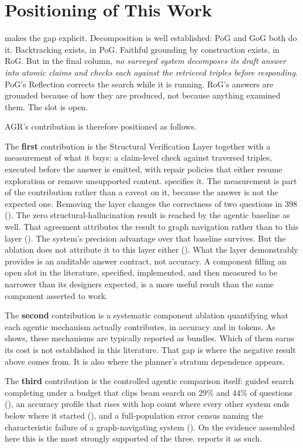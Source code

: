 \section{Positioning of This Work}\label{sec:positioning}

 makes the gap explicit. Decomposition is well
established: PoG and GoG both do it. Backtracking exists, in PoG. Faithful
grounding by construction exists, in RoG. But in the final column, \emph{no
surveyed system decomposes its draft answer into atomic claims and checks each
against the retrieved triples before responding}. PoG's Reflection corrects the
search while it is running. RoG's answers are grounded because of how they are
produced, not because anything examined them. The slot is open.

AGR's contribution is therefore positioned as follows.

The \textbf{first} contribution is the Structural Verification Layer together
with a measurement of what it buys: a claim-level check against traversed
triples, executed before the answer is emitted, with repair policies that either
resume exploration or remove unsupported content. 
specifies it. The measurement is part of the contribution rather than a caveat
on it, because the answer is not the expected one. Removing the layer changes
the correctness of two questions in $398$ (). The zero
structural-hallucination result is reached by the agentic baseline as well.
That agreement attributes the result to graph navigation rather than to this
layer (). The system's precision advantage over
that baseline survives. But the ablation does not attribute it to this layer
either (). What the layer demonstrably provides is an
auditable answer contract, not accuracy. A component filling an open slot in the
literature, specified, implemented, and then measured to be narrower than its
designers expected, is a more useful result than the same component asserted to
work.

The \textbf{second} contribution is a systematic component ablation quantifying
what each agentic mechanism actually contributes, in accuracy and in tokens. As
 shows, these mechanisms are typically reported as
bundles. Which of them earns its cost is not established in this literature.
That gap is where the negative result above comes from. It is also where the
planner's stratum dependence appears.

The \textbf{third} contribution is the controlled agentic comparison itself:
guided search completing under a budget that clips beam search on $29\%$ and
$44\%$ of questions (), an accuracy profile that rises with
hop count where every other system ends below where it started
(), and a full-population error census naming the
characteristic failure of a graph-navigating system (). On the
evidence assembled here this is the most strongly supported of the three.
 reports it as such.

